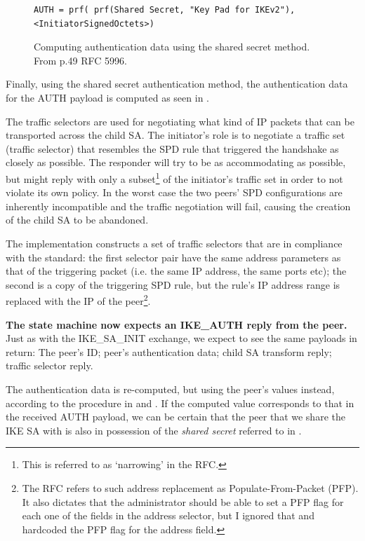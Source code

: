 \documentclass[final,a4paper,twoside,11pt,onecolumn]{report}
\begin{document}
\begin{figure}[h]
\begin{verbatim}
AUTH = prf( prf(Shared Secret, "Key Pad for IKEv2"),
<InitiatorSignedOctets>)
\end{verbatim}
\label{fig:final-sign}
\caption{Computing authentication data using the shared secret method. From p.49 RFC 5996.}
\end{figure}

Finally, using the shared secret authentication method, the authentication data for the AUTH payload is computed as seen in .

The traffic selectors are used for negotiating what kind of IP packets that can be transported across the child SA. The initiator's role is to negotiate a traffic set (traffic selector) that resembles the SPD rule that triggered the handshake as closely as possible. The responder will try to be as accommodating as possible, but might reply with only a subset\footnote{This is referred to as `narrowing' in the RFC.} of the initiator's traffic set in order to not violate its own policy. In the worst case the two peers' SPD configurations are inherently incompatible and the traffic negotiation will fail, causing the creation of the child SA to be abandoned.

The implementation constructs a set of traffic selectors that are in compliance with the standard: the first selector pair have the same address parameters as that of the triggering packet (i.e. the same IP address, the same ports etc); the second is a copy of the triggering SPD rule, but the rule's IP address range is replaced with the IP of the peer\footnote{The RFC refers to such address replacement as Populate-From-Packet (PFP). It also dictates that the administrator should be able to set a PFP flag for each one of the fields in the address selector, but I ignored that and hardcoded the PFP flag for the address field.}.

\textbf{The state machine now expects an IKE\_AUTH reply from the peer.} Just as with the IKE\_SA\_INIT exchange, we expect to see the same payloads in return: The peer's ID; peer's authentication data; child SA transform reply; traffic selector reply.

The authentication data is re-computed, but using the peer's values instead, according to the procedure in  and . If the computed value corresponds to that in the received AUTH payload, we can be certain that the peer that we share the IKE SA with is also in possession of the \emph{shared secret} referred to in .
\end{document}
